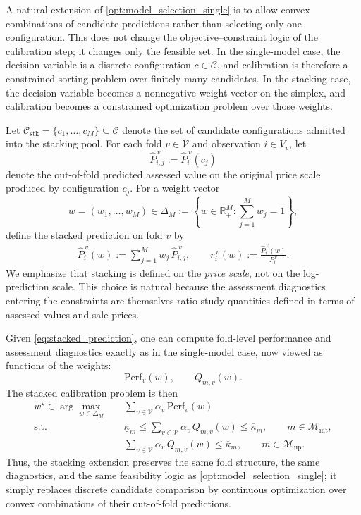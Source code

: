 \documentclass[12pt, draft]{article}
\theoremstyle{plain}
\theoremstyle{definition}
\newcommand{\1}{\mathbf{1}}
\begin{document}
A natural extension of \eqref{opt:model_selection_single} is to allow convex combinations of candidate predictions rather than selecting only one configuration. This does not change the objective--constraint logic of the calibration step; it changes only the feasible set. In the single-model case, the decision variable is a discrete configuration \(c\in\mathcal C\), and calibration is therefore a constrained sorting problem over finitely many candidates. In the stacking case, the decision variable becomes a nonnegative weight vector on the simplex, and calibration becomes a constrained optimization problem over those weights.

Let $\mathcal C_{\mathrm{stk}}=\{c_1,\dots,c_M\}\subseteq\mathcal C$ denote the set of candidate configurations admitted into the stacking pool. For each fold $v\in\mathcal V$ and observation $i\in V_v$, let
\[
\hat P_{i,j}^{\,v}:=\hat P_i^{\,v}(c_j)
\]
denote the out-of-fold predicted assessed value on the original price scale produced by configuration $c_j$. For a weight vector
\[
w=(w_1,\dots,w_M)\in\Delta_M
:=
\left\{
w\in\mathbb R_+^M : \sum_{j=1}^M w_j = 1
\right\},
\]
define the stacked prediction on fold $v$ by
\begin{align}
    \label{eq:stacked_prediction}
    \hat P_i^{\,v}(w)
    :=
    \sum_{j=1}^M w_j\,\hat P_{i,j}^{\,v},
    \qquad
    r_i^{\,v}(w)
    :=
    \frac{\hat P_i^{\,v}(w)}{P_i^{\,v}}.
\end{align}
We emphasize that stacking is defined on the \emph{price scale}, not on the log-prediction scale. This choice is natural because the assessment diagnostics entering the constraints are themselves ratio-study quantities defined in terms of assessed values and sale prices.

Given \eqref{eq:stacked_prediction}, one can compute fold-level performance and assessment diagnostics exactly as in the single-model case, now viewed as functions of the weights:
\[
\mathrm{Perf}_v(w),
\qquad
Q_{m,v}(w).
\]
The stacked calibration problem is then
\begin{align}
    \label{opt:model_selection_stacking}
    w^\star
    \in
    \arg\max_{w\in\Delta_M}
    \quad
    & \sum_{v\in\mathcal V}\alpha_v\,\mathrm{Perf}_v(w)
    \\
    \text{s.t.}\quad
    & \underline{\kappa}_m
      \le
      \sum_{v\in\mathcal V}\alpha_v\,Q_{m,v}(w)
      \le
      \overline{\kappa}_m,
      \qquad
      m\in\mathcal M_{\mathrm{int}},
      \nonumber\\
    & \sum_{v\in\mathcal V}\alpha_v\,Q_{m,v}(w)
      \le
      \overline{\kappa}_m,
      \qquad
      m\in\mathcal M_{\mathrm{up}}.
      \nonumber
\end{align}
Thus, the stacking extension preserves the same fold structure, the same diagnostics, and the same feasibility logic as \eqref{opt:model_selection_single}; it simply replaces discrete candidate comparison by continuous optimization over convex combinations of their out-of-fold predictions.
\end{document}
